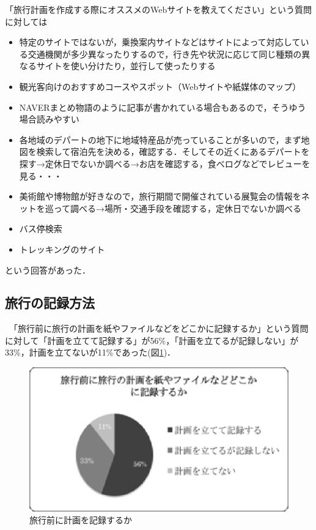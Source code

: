 \documentclass{funthesis}
\begin{document}
「旅行計画を作成する際にオススメのWebサイトを教えてください」という質問に対しては
\begin{itemize}
 \item 特定のサイトではないが，乗換案内サイトなどはサイトによって対応している交通機関が多少異なったりするので，行き先や状況に応じて同じ種類の異なるサイトを使い分けたり，並行して使ったりする
 \item 観光客向けのおすすめコースやスポット（Webサイトや紙媒体のマップ）
 \item NAVERまとめ物語のように記事が書かれている場合もあるので，そうゆう場合読みやすい
 \item 各地域のデパートの地下に地域特産品が売っていることが多いので，まず地図を検索して宿泊先を決める，確認する．そしてその近くにあるデパートを探す→定休日でないか調べる→お店を確認する，食べログなどでレビューを見る・・・
 \item 美術館や博物館が好きなので，旅行期間で開催されている展覧会の情報をネットを巡って調べる→場所・交通手段を確認する，定休日でないか調べる
 \item バス停検索
 \item トレッキングのサイト
\end{itemize}
という回答があった．

\clearpage

\subsection{旅行の記録方法}

　「旅行前に旅行の計画を紙やファイルなどをどこかに記録するか」という質問に対して「計画を立てて記録する」が56\%，「計画を立てるが記録しない」が33\%，計画を立てないが11\%であった(図\ref{Lfilerecord})．

\begin{figure}[htpb]
\begin{center}
\includegraphics[scale=0.65]{filerecord.eps}
\end{center}
\caption{旅行前に計画を記録するか}
\label{Lfilerecord}
\end{figure}
\end{document}
